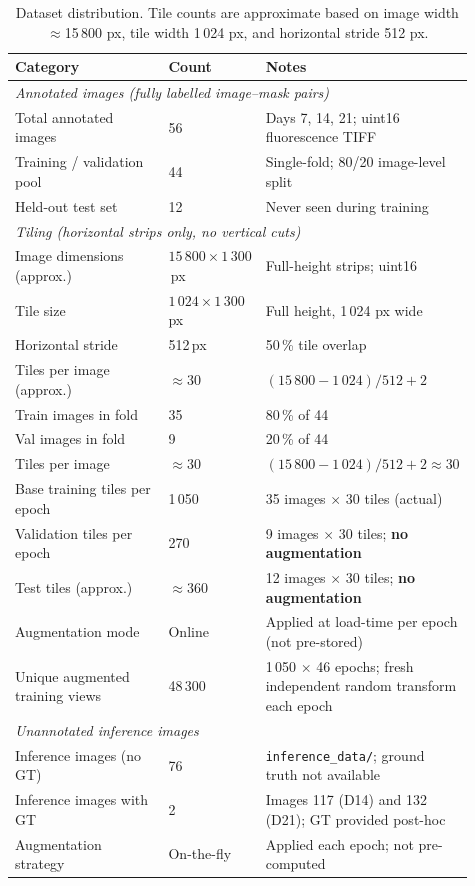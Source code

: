 \documentclass[11pt,letterpaper]{article}
\begin{document}
\begin{table}[htbp]
\centering
\caption{Dataset distribution. Tile counts are approximate based on image width $\approx$15\,800 px, tile width 1\,024 px, and horizontal stride 512 px.}
\begin{tabular}{p{0.40\linewidth}p{0.15\linewidth}p{0.36\linewidth}}
\toprule
Category & Count & Notes \\
\midrule
\multicolumn{3}{l}{\textit{Annotated images (fully labelled image–mask pairs)}} \\
Total annotated images & 56 & Days 7, 14, 21; uint16 fluorescence TIFF \\
Training / validation pool & 44 & Single-fold; 80/20 image-level split \\
Held-out test set & 12 & Never seen during training \\
\midrule
\multicolumn{3}{l}{\textit{Tiling (horizontal strips only, no vertical cuts)}} \\
Image dimensions (approx.) & $15\,800{\times}1\,300$\,px & Full-height strips; uint16 \\
Tile size & $1\,024{\times}1\,300$\,px & Full height, 1\,024 px wide \\
Horizontal stride & 512\,px & 50\,\% tile overlap \\
Tiles per image (approx.) & $\approx 30$ & $(15\,800-1\,024)/512 + 2$ \\
Train images in fold & 35 & 80\,\% of 44 \\
Val images in fold & 9 & 20\,\% of 44 \\
Tiles per image & $\approx 30$ & $(15\,800-1\,024)/512 + 2 \approx 30$ \\
Base training tiles per epoch & 1\,050 & 35 images $\times$ 30 tiles (actual) \\
Validation tiles per epoch & 270 & 9 images $\times$ 30 tiles; \textbf{no augmentation} \\
Test tiles (approx.) & $\approx 360$ & 12 images $\times$ 30 tiles; \textbf{no augmentation} \\
Augmentation mode & Online & Applied at load-time per epoch (not pre-stored) \\
Unique augmented training views & 48\,300 & 1\,050 $\times$ 46 epochs; fresh independent random transform each epoch \\
\midrule
\multicolumn{3}{l}{\textit{Unannotated inference images}} \\
Inference images (no GT) & 76 & \texttt{inference\_data/}; ground truth not available \\
Inference images with GT & 2 & Images 117 (D14) and 132 (D21); GT provided post-hoc \\
\midrule
Augmentation strategy & On-the-fly & Applied each epoch; not pre-computed \\
\bottomrule
\end{tabular}
\label{tab:dataset}
\end{table}
\end{document}
